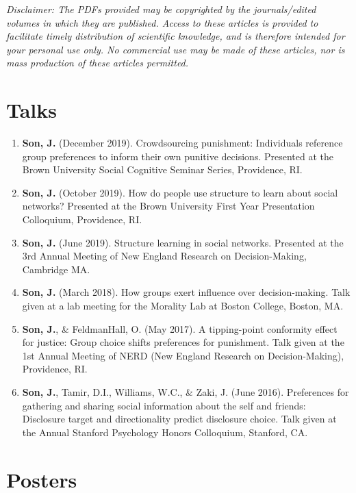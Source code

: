 \documentclass[
]{article}
\begin{document}
\emph{Disclaimer: The PDFs provided may be copyrighted by the
journals/edited volumes in which they are published. Access to these
articles is provided to facilitate timely distribution of scientific
knowledge, and is therefore intended for your personal use only. No
commercial use may be made of these articles, nor is mass production of
these articles permitted.}

\hypertarget{talks}{%
\section{Talks}\label{talks}}

\begin{enumerate}
\def\labelenumi{\arabic{enumi}.}
\item
  \textbf{Son, J.} (December 2019). Crowdsourcing punishment:
  Individuals reference group preferences to inform their own punitive
  decisions. Presented at the Brown University Social Cognitive Seminar
  Series, Providence, RI.
\item
  \textbf{Son, J.} (October 2019). How do people use structure to learn
  about social networks? Presented at the Brown University First Year
  Presentation Colloquium, Providence, RI.
\item
  \textbf{Son, J.} (June 2019). Structure learning in social networks.
  Presented at the 3rd Annual Meeting of New England Research on
  Decision-Making, Cambridge MA.
\item
  \textbf{Son, J.} (March 2018). How groups exert influence over
  decision-making. Talk given at a lab meeting for the Morality Lab at
  Boston College, Boston, MA.
\item
  \textbf{Son, J.}, \& FeldmanHall, O. (May 2017). A tipping-point
  conformity effect for justice: Group choice shifts preferences for
  punishment. Talk given at the 1st Annual Meeting of NERD (New England
  Research on Decision-Making), Providence, RI.
\item
  \textbf{Son, J.}, Tamir, D.I., Williams, W.C., \& Zaki, J. (June
  2016). Preferences for gathering and sharing social information about
  the self and friends: Disclosure target and directionality predict
  disclosure choice. Talk given at the Annual Stanford Psychology Honors
  Colloquium, Stanford, CA.
\end{enumerate}

\hypertarget{posters}{%
\section{Posters}\label{posters}}
\end{document}
